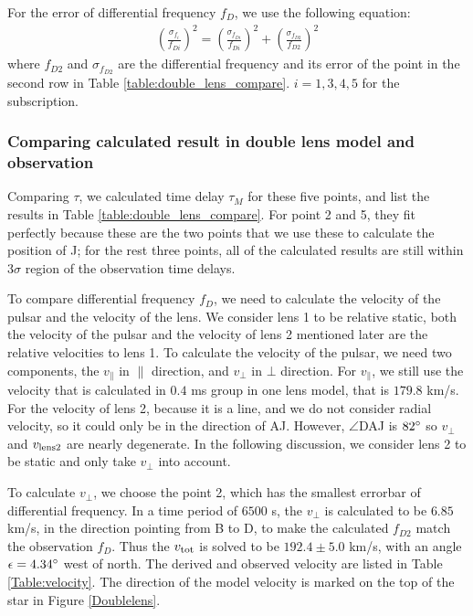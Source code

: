 \documentclass[useAMS,usenatbib]{mn2e}
\begin{document}
For the error of differential frequency $f_D$, we use the following equation:
\begin{equation}
\begin{aligned}
(\frac{\sigma_{f_i}}{f_{Di}})^2=(\frac{\sigma_{f_{Di}}}{f_{Di}})^2+(\frac{\sigma_{f_{D2}}}{f_{D2}})^2
\end{aligned}
\end{equation}
where $f_{D2}$ and $\sigma_{f_{D2}}$ are the differential frequency and its error of the point in the second row in Table \ref{table:double_lens_compare}. $i=1,3,4,5$ for the subscription.

\subsubsection{Comparing calculated result in double lens model and observation}
Comparing $\tau$, we calculated time delay $\tau_M$ for these five points, and list the results in Table \ref{table:double_lens_compare}. For point 2 and 5, they fit perfectly because these are the two points that we use these to calculate the position of J; for the rest three points, all of the calculated results are still within $3\sigma$ region of the observation time delays.

To compare differential frequency $f_D$, we need to calculate the velocity of the pulsar and the velocity of the lens. We consider lens 1 to be relative static, both the velocity of the pulsar and the velocity of lens 2 mentioned later are the relative velocities to lens 1.
To calculate the velocity of the pulsar, we need two components, the
$v_{\parallel}$ in ${\parallel}$ direction, and $v_{\bot}$ in ${\bot}$
direction.%
For $v_{\parallel}$, we still use the velocity that is calculated in $0.4$ ms group in one lens model, that is $179.8$ km/s. For the velocity of lens 2, because it is a line, and we do not consider radial velocity, so it could only be in the direction of AJ. However, $\angle$DAJ is $82\degree$ so $v_{\bot}$ and $v_{\rm lens2}$ are nearly degenerate. In the following discussion, we consider lens 2 to be static and only take $v_{\bot}$ into account.

To calculate $v_{\bot}$, we choose the point 2, which has the smallest
errorbar of differential frequency. In a time period of $6500$ s, the
$v_{\bot}$ is calculated to be $6.85$ km/s, in the direction pointing
from B to D, to make the calculated $f_{D2}$ match the observation
$f_D$. Thus the $v_{\rm tot}$ is solved to be $192.4\pm 5.0$ km/s,
with an angle $\epsilon=4.34\degree$ west of north. The derived and
observed velocity are listed in Table \ref{Table:velocity}. The
direction of the model velocity is marked on the top of the star in
Figure \ref{Doublelens}.
\end{document}
